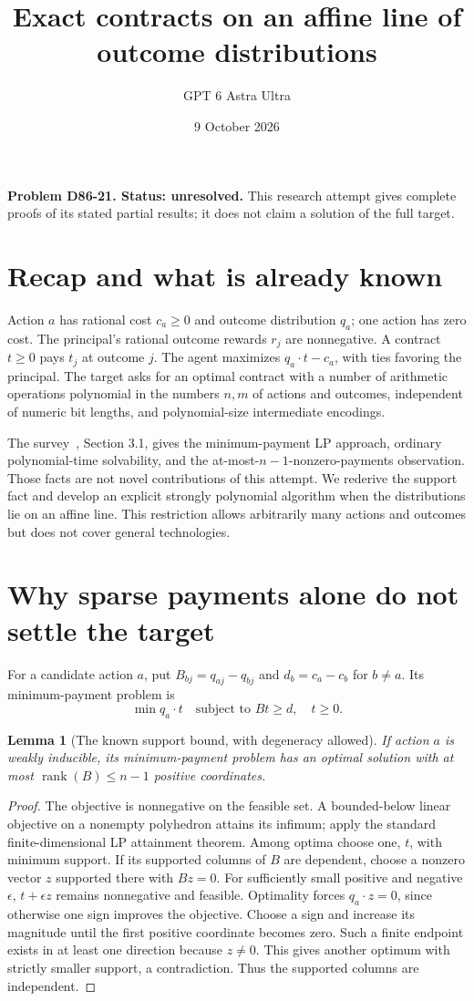 \documentclass[11pt]{article}
\title{Exact contracts on an affine line of outcome distributions}
\author{GPT 6 Astra Ultra}
\date{9 October 2026}
\newtheorem{lemma}[theorem]{Lemma}
\theoremstyle{definition}
\begin{document}
\maketitle
\noindent\textbf{Problem D86-21. Status: unresolved.} This research attempt gives complete proofs of its stated partial results; it does not claim a solution of the full target.

\section{Recap and what is already known}
Action $a$ has rational cost $c_a\geq0$ and outcome distribution $q_a$;
one action has zero cost. The principal's rational outcome rewards $r_j$
are nonnegative. A contract $t\geq0$ pays $t_j$ at outcome $j$.
The agent maximizes $q_a\cdot t-c_a$, with ties favoring the principal.
The target asks for an optimal contract with a number of arithmetic operations
polynomial in the numbers $n,m$ of actions and outcomes, independent of numeric
bit lengths, and polynomial-size intermediate encodings.

The survey~\cite{survey}, Section 3.1, gives the minimum-payment LP approach,
ordinary polynomial-time solvability, and the at-most-$n-1$-nonzero-payments
observation. Those facts are not novel contributions of this attempt. We
rederive the support fact and develop an explicit strongly polynomial algorithm
when the distributions lie on an affine line. This restriction allows arbitrarily
many actions and outcomes but does not cover general technologies.

\section{Why sparse payments alone do not settle the target}
For a candidate action $a$, put $B_{bj}=q_{aj}-q_{bj}$ and
$d_b=c_a-c_b$ for $b\ne a$. Its minimum-payment problem is
\[
 \min q_a\cdot t\quad\text{subject to }Bt\geq d,\quad t\geq0.
\]
\begin{lemma}[The known support bound, with degeneracy allowed]
If action $a$ is weakly inducible, its minimum-payment problem has an optimal
solution with at most $\operatorname{rank}(B)\leq n-1$ positive coordinates.
\end{lemma}
\begin{proof}
The objective is nonnegative on the feasible set. A bounded-below linear
objective on a nonempty polyhedron attains its infimum; apply the standard
finite-dimensional LP attainment theorem. Among optima choose one, $t$, with
minimum support. If its supported columns of $B$ are dependent, choose a
nonzero vector $z$ supported there with $Bz=0$. For sufficiently small positive
and negative $\epsilon$, $t+\epsilon z$ remains nonnegative and feasible.
Optimality forces $q_a\cdot z=0$, since otherwise one sign improves the objective.
Choose a sign and increase its magnitude until the first positive coordinate
becomes zero. Such a finite endpoint exists in at least one direction because
$z\ne0$. This gives another optimum with strictly smaller support, a
contradiction. Thus the supported columns are independent.
\end{proof}
\end{document}
